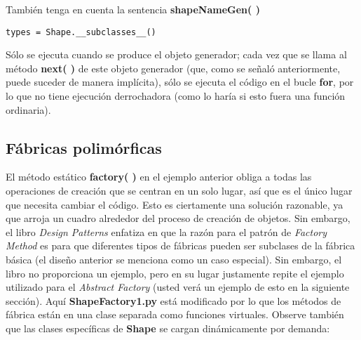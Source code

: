 También tenga en cuenta la sentencia \textbf{shapeNameGen( )}  \newline

\begin{lstlisting}
types = Shape.__subclasses__()
\end{lstlisting}

Sólo se ejecuta cuando se produce el objeto generador; cada vez que se llama al método \textbf{next( )} de este objeto generador (que, como se señaló anteriormente, puede suceder de manera implícita), sólo se ejecuta el código en el bucle \textbf{for}, por lo que no tiene ejecución derrochadora (como lo haría si esto fuera una función ordinaria).  \newline

\subsection*{Fábricas polimórficas}
\label{subsec:fp}

El método estático \textbf{factory( )} en el ejemplo anterior obliga a todas las operaciones de creación que se centran en un solo lugar, así que es el único lugar que necesita cambiar el código. Esto es ciertamente una solución razonable, ya que arroja un cuadro alrededor del proceso de creación de objetos. Sin embargo, el libro \textit{Design Patterns} enfatiza en que la razón para el patrón de \textit{Factory Method} es para que diferentes tipos de fábricas pueden ser subclases de la fábrica básica (el diseño anterior se menciona como un caso especial). Sin embargo, el libro no proporciona un ejemplo, pero en su lugar justamente repite el ejemplo utilizado para el \textit{Abstract Factory} (usted verá un ejemplo de esto en la siguiente sección). Aquí \textbf{ShapeFactory1.py} está modificado por lo que los métodos de fábrica están en una clase separada como funciones virtuales. Observe también que las clases específicas de \textbf{Shape} se cargan dinámicamente por demanda:    \newline

